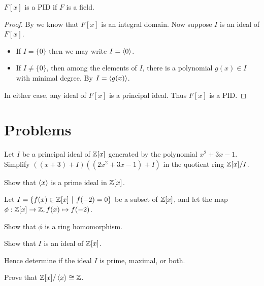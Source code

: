 \begin{theorem}
    $F[x]$ is a PID if $F$ is a field.
\end{theorem}
\begin{proof}
    By  we know that $F[x]$ is an integral domain. Now suppose $I$ is an ideal of $F[x]$.
    \begin{itemize}
        \item If $I = \{0\}$ then we may write $I = \left\langle0\right\rangle$.
        \item If $I \neq \{0\}$, then among the elements of $I$, there is a polynomial $g(x) \in I$ with minimal degree. By  $I = \left\langle g(x)\right\rangle$.
    \end{itemize}
    In either case, any ideal of $F[x]$ is a principal ideal. Thus $F[x]$ is a PID.
\end{proof}

\newpage

\section{Problems}
\begin{problem}
    Let $I$ be a principal ideal of $\mathbb{Z}[x]$ generated by the polynomial $x^2 + 3x - 1$. Simplify $\left((x + 3) + I\right)\left((2x^2 + 3x - 1) + I\right)$ in the quotient ring $\mathbb{Z}[x]/I$.
\end{problem}

\begin{problem}
    Show that $\left\langle x\right\rangle$ is a prime ideal in $\mathbb{Z}[x]$.
\end{problem}

\begin{problem}
    Let $I = \{f(x) \in \Z[x] \vert f(-2) = 0\}$ be a subset of $\mathbb{Z}[x]$, and let the map $\phi:\mathbb{Z}[x]\to\mathbb{Z}, f(x) \mapsto f(-2)$.
    \begin{partquestions}{\roman*}
        \item Show that $\phi$ is a ring homomorphism.
        \item Show that $I$ is an ideal of $\mathbb{Z}[x]$.
        \item Hence determine if the ideal $I$ is prime, maximal, or both.
    \end{partquestions}
\end{problem}

\begin{problem}
    Prove that $\mathbb{Z}[x] / \left\langle x\right\rangle \cong \mathbb{Z}$.
\end{problem}

